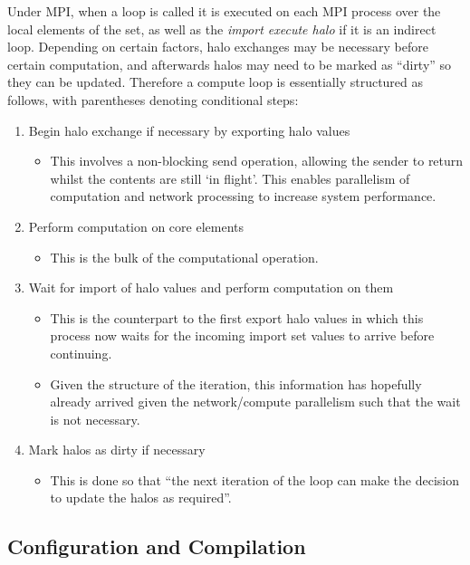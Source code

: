 Under MPI, when a loop is called it is executed on each MPI process over the local elements of the set, as well as the \textit{import execute halo} if it is an indirect loop. Depending on certain factors, halo exchanges may be necessary before certain computation, and afterwards halos may need to be marked as ``dirty'' so they can be updated. Therefore a compute loop is essentially structured as follows, with parentheses denoting conditional steps:
\begin{enumerate}
    \item Begin halo exchange if necessary by exporting halo values
    \begin{itemize}
        \item This involves a non-blocking send operation, allowing the sender to return whilst the contents are still `in flight'. This enables parallelism of computation and network processing to increase system performance.
    \end{itemize}
    \item Perform computation on core elements
    \begin{itemize}
        \item This is the bulk of the computational operation.
    \end{itemize}
    \item Wait for import of halo values and perform computation on them
    \begin{itemize}
        \item This is the counterpart to the first export halo values in which this process now waits for the incoming import set values to arrive before continuing.
        \item Given the structure of the iteration, this information has hopefully already arrived given the network/compute parallelism such that the wait is not necessary. 
    \end{itemize}
    \item Mark halos as dirty if necessary
    \begin{itemize}
        \item This is done so that ``the next iteration of the loop can make the decision to update the halos as required''\cite{mpi-dev}.
    \end{itemize}
\end{enumerate}



\subsection{Configuration and Compilation}

